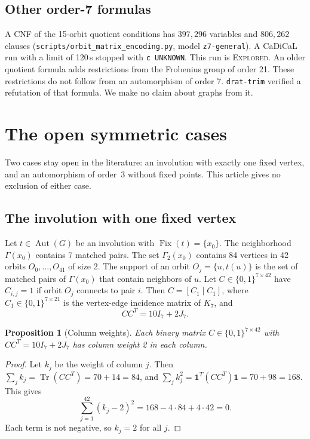 \documentclass[pdflatex,sn-mathphys-num]{sn-jnl}
\theoremstyle{thmstyleone}
\newtheorem{proposition}[theorem]{Proposition}
\theoremstyle{thmstyletwo}
\theoremstyle{thmstylethree}
\DeclareMathOperator{\Aut}{Aut}
\DeclareMathOperator{\Fix}{Fix}
\DeclareMathOperator{\Tr}{Tr}
\numberwithin{equation}{section}
\begin{document}
\subsection{Other order-7 formulas}

A CNF of the 15-orbit quotient conditions has $397{,}296$ variables and $806{,}262$ clauses (\texttt{scripts/orbit\_matrix\_encoding.py}, model \texttt{z7-general}). A CaDiCaL run with a limit of 120\,s stopped with \texttt{c UNKNOWN}. This run is \textsc{Explored}.
An older quotient formula adds restrictions from the Frobenius group of order 21. These restrictions do not follow from an automorphism of order 7. \texttt{drat-trim} verified a refutation of that formula. We make no claim about graphs from it.

\section{The open symmetric cases}
\label{sec:open}

Two cases stay open in the literature: an involution with exactly one fixed vertex, and an automorphism of order~3 without fixed points. This article gives no exclusion of either case.

\subsection{The involution with one fixed vertex}

Let $t \in \Aut(G)$ be an involution with $\Fix(t) = \{x_0\}$. The neighborhood $\Gamma(x_0)$ contains 7 matched pairs. The set $\Gamma_2(x_0)$ contains 84 vertices in 42 orbits $O_0, \dots, O_{41}$ of size 2.
The support of an orbit $O_j = \{u, t(u)\}$ is the set of matched pairs of $\Gamma(x_0)$ that contain neighbors of $u$.
Let $C \in \{0, 1\}^{7 \times 42}$ have $C_{i,j} = 1$ if orbit $O_j$ connects to pair $i$.
Then $C = [C_1 \mid C_1]$, where $C_1 \in \{0,1\}^{7 \times 21}$ is the vertex-edge incidence matrix of $K_7$, and
\begin{equation}
 C C^T = 10 I_7 + 2 J_7.
 \label{eq:cct}
\end{equation}

\begin{proposition}[Column weights]
Each binary matrix $C \in \{0, 1\}^{7 \times 42}$ with $C C^T = 10 I_7 + 2 J_7$ has column weight 2 in each column.
\end{proposition}
\begin{proof}
Let $k_j$ be the weight of column $j$. Then $\sum_j k_j = \Tr(C C^T) = 70 + 14 = 84$, and $\sum_j k_j^2 = \mathbf{1}^T (C C^T) \mathbf{1} = 70 + 98 = 168$. This gives
\begin{equation}
 \sum_{j=1}^{42} (k_j - 2)^2 = 168 - 4 \cdot 84 + 4 \cdot 42 = 0.
\end{equation}
Each term is not negative, so $k_j = 2$ for all $j$.
\end{proof}
\end{document}
